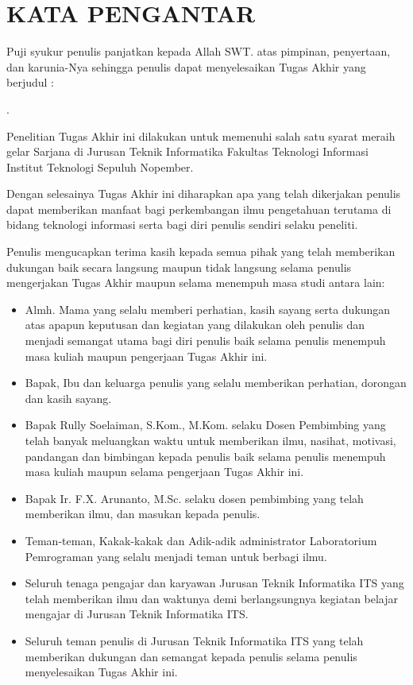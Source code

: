 \chapter{KATA PENGANTAR}

\indent\indent Puji syukur penulis panjatkan kepada Allah SWT. atas pimpinan, penyertaan, dan karunia-Nya sehingga penulis dapat menyelesaikan Tugas Akhir yang berjudul :
\begin{center}
	\textbf{\MakeUppercase{\judul}}.
\end{center}

Penelitian Tugas Akhir ini dilakukan untuk memenuhi salah satu syarat meraih gelar Sarjana di Jurusan Teknik Informatika Fakultas Teknologi Informasi Institut Teknologi Sepuluh Nopember.

Dengan selesainya Tugas Akhir ini diharapkan apa yang telah dikerjakan penulis dapat memberikan manfaat bagi perkembangan ilmu pengetahuan terutama di bidang teknologi informasi serta bagi diri penulis sendiri selaku peneliti.

Penulis mengucapkan terima kasih kepada semua pihak yang telah memberikan dukungan baik secara langsung maupun tidak langsung selama penulis mengerjakan Tugas Akhir maupun selama menempuh masa studi antara lain:

\begin{itemize}
	\item Almh. Mama yang selalu memberi perhatian, kasih sayang serta dukungan atas apapun keputusan dan kegiatan yang dilakukan oleh penulis dan menjadi semangat utama bagi diri penulis baik selama penulis menempuh masa kuliah maupun pengerjaan Tugas Akhir ini.
	\item Bapak, Ibu dan keluarga penulis yang selalu memberikan perhatian, dorongan dan kasih sayang.
	\item Bapak Rully Soelaiman, S.Kom., M.Kom. selaku Dosen Pembimbing yang telah banyak meluangkan waktu untuk memberikan ilmu, nasihat, motivasi, pandangan dan bimbingan kepada penulis baik selama penulis menempuh masa kuliah maupun selama pengerjaan Tugas Akhir ini.
	\item Bapak Ir. F.X. Arunanto, M.Sc. selaku dosen pembimbing yang telah memberikan ilmu, dan masukan kepada penulis.
	\item Teman-teman, Kakak-kakak dan Adik-adik administrator Laboratorium Pemrograman yang selalu menjadi teman untuk berbagi ilmu.
	\item Seluruh tenaga pengajar dan karyawan Jurusan Teknik Informatika ITS yang telah memberikan ilmu dan waktunya demi berlangsungnya kegiatan belajar mengajar di Jurusan Teknik Informatika ITS.
	\item Seluruh teman penulis di Jurusan Teknik Informatika ITS yang telah memberikan dukungan dan semangat kepada penulis selama penulis menyelesaikan Tugas Akhir ini.
\end{itemize}

